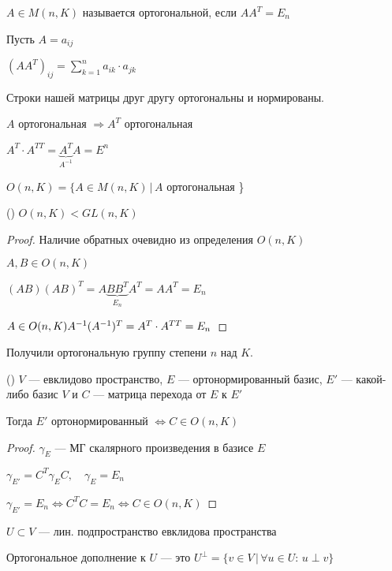 \begin{conj}
    $A \in M(n, K)$ называется ортогональной, если $AA^T = E_n$
    
    Пусть $A = a_{ij}$

    $(AA^T)_{ij} = \sum_{k = 1}^{n} a_{ik} \cdot a_{jk}$

    Строки нашей матрицы друг другу ортогональны и нормированы.
\end{conj}

\begin{lemma}
    $A$ ортогональная $\Longrightarrow A^T$ ортогональная

    $A^T \cdot A^{TT} = \underbrace{A^T}_{\text{$A^{-1}$}}A = E^n$

    $O(n, K) = \{ A \in M(n, K) \, | \, A$ ортогональная \}
\end{lemma}

\begin{theorem}()
    $O(n, K) < GL(n, K)$
    \begin{proof}
    \emptyln

    Наличие обратных очевидно из определения $O(n, K)$

    $A, B \in O(n, K)$

    $(AB)(AB)^T = A\underbrace{BB^T}_{\text{$E_n$}}A^T = AA^T = E_n$

    $A \in O(n, K) \\
    A^{-1}(A^{-1})^T = A^T \cdot A^{TT} = E_n$
    \end{proof}
    
    Получили ортогональную группу степени $n$ над $K$.
\end{theorem}

\begin{theorem}()
    $V$ --- евклидово пространство, $E$ --- ортонормированный базис, $E'$ --- какой-либо базис $V$ и $C$ --- матрица перехода от $E$ к $E'$

    Тогда $E'$ ортонормированный $\Longleftrightarrow C \in O(n, K)$

    \begin{proof}
    \emptyln
    $\gamma_E$ --- МГ скалярного произведения в базисе $E$

    $\gamma_{E'} = C^T \gamma_E C, \quad \gamma_E = E_n$

    $\gamma_{E'} = E_n \Longleftrightarrow C^TC = E_n \Longleftrightarrow C \in O(n, K)$
    \end{proof}
\end{theorem}
\begin{conj}
$U \subset V$ --- лин. подпространство евклидова пространства 

Ортогональное дополнение к $U$ --- это $U^{\perp} = \{ v \in V \, | \, \forall u \in U: \, u \perp v \}$
\end{conj}

